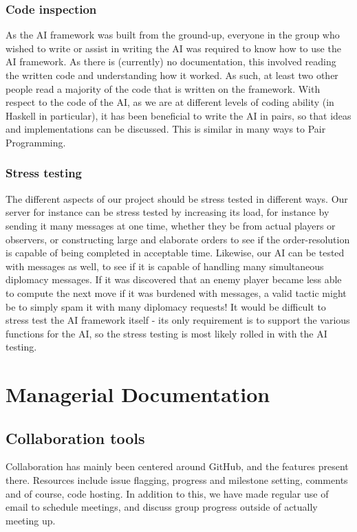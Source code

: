 \documentclass[12pt]{article}
\begin{document}
\subsubsection{Code inspection}
As the AI framework was built from the ground-up, everyone in the group who wished to write or assist in writing the AI was required to know how to use the AI framework. As there is (currently) no documentation, this involved reading the written code and understanding how it worked. As such, at least two other people read a majority of the code that is written on the framework. With respect to the code of the AI, as we are at different levels of coding ability (in Haskell in particular), it has been beneficial to write the AI in pairs, so that ideas and implementations can be discussed. This is similar in many ways to Pair Programming.

\subsubsection{Stress testing}
The different aspects of our project should be stress tested in different ways. Our server for instance can be stress tested by increasing its load, for instance by sending it many messages at one time, whether they be from actual players or observers, or constructing large and elaborate orders to see if the order-resolution is capable of being completed in acceptable time. Likewise, our AI can be tested with messages as well, to see if it is capable of handling many simultaneous diplomacy messages. If it was discovered that an enemy player became less able to compute the next move if it was burdened with messages, a valid tactic might be to simply spam it with many diplomacy requests! It would be difficult to stress test the AI framework itself - its only requirement is to support the various functions for the AI, so the stress testing is most likely rolled in with the AI testing. 

\section{Managerial Documentation}
\subsection{Collaboration tools}
Collaboration has mainly been centered around GitHub, and the features present there. Resources include issue flagging, progress and milestone setting, comments and of course, code hosting. In addition to this, we have made regular use of email to schedule meetings, and discuss group progress outside of actually meeting up.
\end{document}
